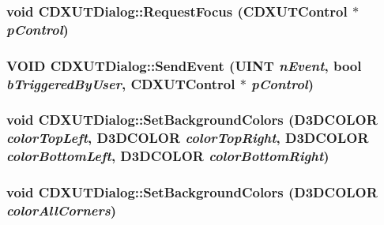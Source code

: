 \label{class_c_d_x_u_t_dialog_ae30dd98c7baecd3d544ab15c17a32bd3}
\hypertarget{class_c_d_x_u_t_dialog_ad5af120ffc7df861267194e00a7b75ca}{
\subsubsection[{RequestFocus}]{\setlength{\rightskip}{0pt plus 5cm}void CDXUTDialog::RequestFocus ({\bf CDXUTControl} $\ast$ {\em pControl})}}
\label{class_c_d_x_u_t_dialog_ad5af120ffc7df861267194e00a7b75ca}
\hypertarget{class_c_d_x_u_t_dialog_a8f4afe62626f97855d35438db64c527a}{
\subsubsection[{SendEvent}]{\setlength{\rightskip}{0pt plus 5cm}VOID CDXUTDialog::SendEvent (UINT {\em nEvent}, \/  bool {\em bTriggeredByUser}, \/  {\bf CDXUTControl} $\ast$ {\em pControl})}}
\label{class_c_d_x_u_t_dialog_a8f4afe62626f97855d35438db64c527a}
\hypertarget{class_c_d_x_u_t_dialog_a21a0a60808aacbe1af926d3b49589a18}{
\subsubsection[{SetBackgroundColors}]{\setlength{\rightskip}{0pt plus 5cm}void CDXUTDialog::SetBackgroundColors (D3DCOLOR {\em colorTopLeft}, \/  D3DCOLOR {\em colorTopRight}, \/  D3DCOLOR {\em colorBottomLeft}, \/  D3DCOLOR {\em colorBottomRight})}}
\label{class_c_d_x_u_t_dialog_a21a0a60808aacbe1af926d3b49589a18}
\hypertarget{class_c_d_x_u_t_dialog_a787ba45509239dc186d2632984e52bb9}{
\subsubsection[{SetBackgroundColors}]{\setlength{\rightskip}{0pt plus 5cm}void CDXUTDialog::SetBackgroundColors (D3DCOLOR {\em colorAllCorners})}}
\label{class_c_d_x_u_t_dialog_a787ba45509239dc186d2632984e52bb9}
